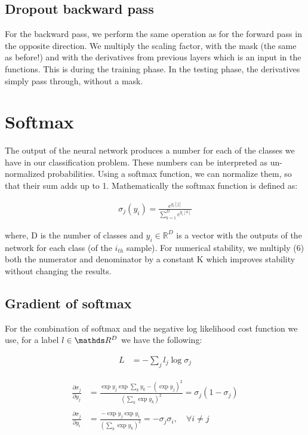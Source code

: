 \documentclass[12pt,twoside]{article}
\begin{document}
\subsection{Dropout backward pass}

For the backward pass, we perform the same operation as for the forward pass in the opposite direction. We multiply the scaling factor, with the mask (the same as before!) and with the derivatives from previous layers which is an input in the functions. This is during the training phase. In the testing phase, the derivatives simply pass through, without a mask. 



\section{Softmax}

The output of the neural network produces a number for each of the classes we have in our classification problem. These numbers can be interpreted as un-normalized probabilities. Using a softmax function, we can normalize them, so that their sum adds up to 1.
Mathematically the softmax function is defined as:

\begin{align}
\sigma_j (y_i) = \frac{e^{y_i[j]}}{\sum_{k=1}^{D} e^{y_i[k]}}
\end{align}

where, D is the number of classes and $y_i \in \mathbb{R}^D$ is a vector with the outputs of the network for each class (of the $i_{th}$ sample). For numerical stability, we multiply (6) both the numerator and denominator by a constant K which improves stability without changing the results.



\subsection{Gradient of softmax}
For the combination of softmax and the negative log likelihood cost function we use, for a label $l \in \R^{D}$ we have the following:

\begin{align*}
L &= - \sum_j l_j \log \sigma_j
\end{align*}

\begin{align*}
\frac{\partial \sigma_j}{\partial y_j} &= \frac{\exp y_j \exp \sum_k y_k - (\exp y_j)^2}{(\sum_k \exp y_k)^2}= \sigma_j (1 - \sigma_j)\\
\\
\frac{\partial \sigma_j}{\partial y_i} &= \frac{-\exp y_j \exp y_i}{(\sum_k \exp y_k)^2}= -\sigma_j \sigma_i, \quad \forall i \neq j
\end{align*}
\end{document}
